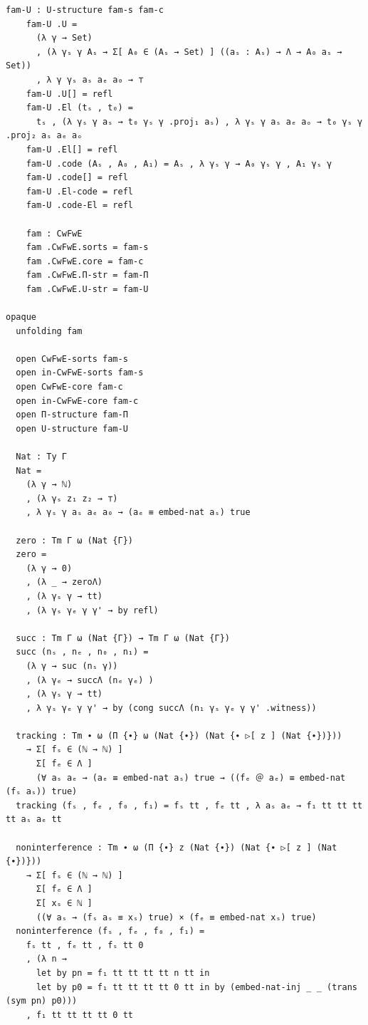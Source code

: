 \documentclass[10pt,a4paper]{article}
\theoremstyle{definition}
\theoremstyle{remark}
\begin{document}
{\begin{Verbatim}[breaklines=true,breakanywhere=true,fontsize=\scriptsize]
    fam-U : U-structure fam-s fam-c
    fam-U .U =
      (λ γ → Set)
      , (λ γₛ γ Aₛ → Σ[ A₀ ∈ (Aₛ → Set) ] ((aₛ : Aₛ) → Λ → A₀ aₛ → Set))
      , λ γ γₛ aₛ aₑ a₀ → ⊤
    fam-U .U[] = refl
    fam-U .El (tₛ , t₀) =
      tₛ , (λ γₛ γ aₛ → t₀ γₛ γ .proj₁ aₛ) , λ γₛ γ aₛ aₑ aₒ → t₀ γₛ γ .proj₂ aₛ aₑ aₒ
    fam-U .El[] = refl
    fam-U .code (Aₛ , A₀ , A₁) = Aₛ , λ γₛ γ → A₀ γₛ γ , A₁ γₛ γ
    fam-U .code[] = refl
    fam-U .El-code = refl
    fam-U .code-El = refl

    fam : CwFwE
    fam .CwFwE.sorts = fam-s
    fam .CwFwE.core = fam-c
    fam .CwFwE.Π-str = fam-Π
    fam .CwFwE.U-str = fam-U

opaque
  unfolding fam

  open CwFwE-sorts fam-s
  open in-CwFwE-sorts fam-s
  open CwFwE-core fam-c
  open in-CwFwE-core fam-c
  open Π-structure fam-Π
  open U-structure fam-U

  Nat : Ty Γ
  Nat =
    (λ γ → ℕ) 
    , (λ γₛ z₁ z₂ → ⊤)
    , λ γₛ γ aₛ aₑ a₀ → (aₑ ≡ embed-nat aₛ) true

  zero : Tm Γ ω (Nat {Γ})
  zero =
    (λ γ → 0)
    , (λ _ → zeroΛ)
    , (λ γₛ γ → tt)
    , (λ γₛ γₑ γ γ' → by refl)

  succ : Tm Γ ω (Nat {Γ}) → Tm Γ ω (Nat {Γ})
  succ (nₛ , nₑ , n₀ , n₁) =
    (λ γ → suc (nₛ γ))
    , (λ γₑ → succΛ (nₑ γₑ) )
    , (λ γₛ γ → tt)
    , λ γₛ γₑ γ γ' → by (cong succΛ (n₁ γₛ γₑ γ γ' .witness))

  tracking : Tm ∙ ω (Π {∙} ω (Nat {∙}) (Nat {∙ ▷[ z ] (Nat {∙})}))
    → Σ[ fₛ ∈ (ℕ → ℕ) ]
      Σ[ fₑ ∈ Λ ]
      (∀ aₛ aₑ → (aₑ ≡ embed-nat aₛ) true → ((fₑ ＠ aₑ) ≡ embed-nat (fₛ aₛ)) true)
  tracking (fₛ , fₑ , f₀ , f₁) = fₛ tt , fₑ tt , λ aₛ aₑ → f₁ tt tt tt tt aₛ aₑ tt

  noninterference : Tm ∙ ω (Π {∙} z (Nat {∙}) (Nat {∙ ▷[ z ] (Nat {∙})}))
    → Σ[ fₛ ∈ (ℕ → ℕ) ]
      Σ[ fₑ ∈ Λ ]
      Σ[ xₛ ∈ ℕ ]
      ((∀ aₛ → (fₛ aₛ ≡ xₛ) true) × (fₑ ≡ embed-nat xₛ) true)
  noninterference (fₛ , fₑ , f₀ , f₁) =
    fₛ tt , fₑ tt , fₛ tt 0
    , (λ n →
      let by pn = f₁ tt tt tt tt n tt in
      let by p0 = f₁ tt tt tt tt 0 tt in by (embed-nat-inj _ _ (trans (sym pn) p0)))
    , f₁ tt tt tt tt 0 tt


\end{Verbatim}
}



\end{document}
